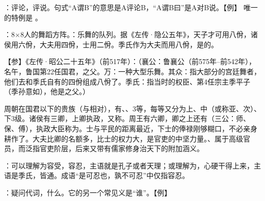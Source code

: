 {
\item {}：评论，评说。句式“A谓B”的意思是A评论B，“A谓B曰”是A对B说。【例】 唯一的特例是 。
\item {}：8×8人的舞蹈方阵。：乐舞的队列。据《左传·隐公五年》，天子才可用八佾，诸侯用六佾，大夫用四佾，士用二佾。季氏作为大夫而用八佾，是的。

【参】《左传·昭公二十五年》（前517年）：（襄公：鲁襄公（前575年--前542年），名午，鲁国第22任国君，之父。万：一种大型乐舞。其众：指大部分的宫廷舞者，他们去和季氏自有的四佾组成八佾了。季氏：指当时的权臣、第4任宗主季平子（季孙意如），他是之父。）

周朝在国君以下的贵族（与相对），有、、3等，每等又分为上、中（或称亚、次）、下3级。诸侯有三卿，上卿执政，又称。周王有六卿，卿之上还有（三公：师、保、傅），执政大臣称为。士与平民的距离最近，下士的俸禄刚够糊口，不必亲身耕作了。大夫比卿的名额多，比士的权力大，是官吏的中坚力量。、属于高级官员，而泛指官吏阶层，后来又带有儒家修身治天下的附加涵义。

\item {}：可以理解为容受，容忍，主语就是孔子或者天理；或理解为，心硬干得上来，主语是季氏，皆通。成语“是可忍也，孰不可忍”中仅指容忍。
\item {}：疑问代词，什么。它的另一个常见义是“谁”。【例】 
}
{}


